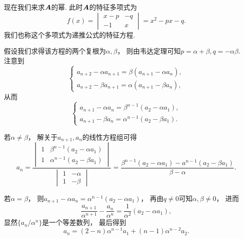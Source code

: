 现在我们来求\(\boldsymbol{A}\)的幂.
此时\(\boldsymbol{A}\)的特征多项式为\begin{equation*}
	f(x)
	= \begin{vmatrix}
		x-p & -q \\
		-1 & x
	\end{vmatrix}
	= x^2 - px - q.
\end{equation*}
我们也称这个多项式为递推公式的特征方程.

假设我们求得该方程的两个复根为\(\alpha,\beta\)，
则由韦达定理可知\(p=\alpha+\beta, q=-\alpha\beta\).
注意到\begin{equation*}
	\left\{ \begin{array}{l}
		a_{n+2} - \alpha a_{n+1} = \beta(a_{n+1}-\alpha a_n), \\
		a_{n+2} - \beta a_{n+1} = \alpha(a_{n+1}-\beta a_n),
	\end{array} \right.
\end{equation*}
从而\begin{equation*}
	\left\{ \begin{array}{l}
		a_{n+1} - \alpha a_n = \beta^{n-1} (a_2 - \alpha a_1), \\
		a_{n+1} - \beta a_n = \alpha^{n-1} (a_2 - \beta a_1).
	\end{array} \right.
\end{equation*}

若\(\alpha\neq\beta\)，
解关于\(a_{n+1},a_n\)的线性方程组可得\begin{equation*}
	a_n
	= \frac
		{
			\begin{vmatrix}
				1 & \beta^{n-1}(a_2 - \alpha a_1) \\
				1 & \alpha^{n-1}(a_2 - \beta a_1)
			\end{vmatrix}
		}
		{
			\begin{vmatrix}
				1 & -\alpha \\
				1 & -\beta
			\end{vmatrix}
		}
	= \frac{\beta^{n-1} (a_2 - \alpha a_1) - a^{n-1} (a_2 - \beta a_1)}{\beta-\alpha}.
\end{equation*}

若\(\alpha=\beta\)，
则\(a_{n+1} - \alpha a_n = \alpha^{n-1} (a_2 - \alpha a_1)\)，
再由\(q\neq0\)可知\(\alpha,\beta\neq0\)，
进而\begin{equation*}
	\frac{a_{n+1}}{\alpha^{n+1}} - \frac{a_n}{\alpha^n}
	= \frac{1}{\alpha^2}(a_2-\alpha a_1),
\end{equation*}
显然\(\{a_n/\alpha^n\}\)是一个等差数列，
最后得到\begin{equation*}
	a_n = (2-n)\alpha^{n-1} a_1 + (n-1) \alpha^{n-2} a_2.
\end{equation*}

